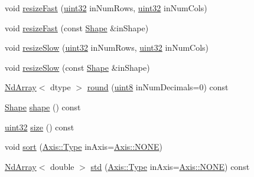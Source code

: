 \begin{DoxyCompactItemize}
\item 
void \mbox{\hyperlink{class_num_c_1_1_nd_array_a6a46a3ea9c292d315d6dc2e6381d2e0f}{resize\+Fast}} (\mbox{\hyperlink{namespace_num_c_ae685802ca6d3035f2b400b081e3953fa}{uint32}} in\+Num\+Rows, \mbox{\hyperlink{namespace_num_c_ae685802ca6d3035f2b400b081e3953fa}{uint32}} in\+Num\+Cols)
\item 
void \mbox{\hyperlink{class_num_c_1_1_nd_array_a2426f7ae3429f859e12e61f64965c81c}{resize\+Fast}} (const \mbox{\hyperlink{class_num_c_1_1_shape}{Shape}} \&in\+Shape)
\item 
void \mbox{\hyperlink{class_num_c_1_1_nd_array_abe49f888c39334d1a743f39fe45dc5ea}{resize\+Slow}} (\mbox{\hyperlink{namespace_num_c_ae685802ca6d3035f2b400b081e3953fa}{uint32}} in\+Num\+Rows, \mbox{\hyperlink{namespace_num_c_ae685802ca6d3035f2b400b081e3953fa}{uint32}} in\+Num\+Cols)
\item 
void \mbox{\hyperlink{class_num_c_1_1_nd_array_a5a73a3515f3be49f89af26ae3103c2a8}{resize\+Slow}} (const \mbox{\hyperlink{class_num_c_1_1_shape}{Shape}} \&in\+Shape)
\item 
\mbox{\hyperlink{class_num_c_1_1_nd_array}{Nd\+Array}}$<$ dtype $>$ \mbox{\hyperlink{class_num_c_1_1_nd_array_ac083fe73fd750871618990f44b3a854d}{round}} (\mbox{\hyperlink{namespace_num_c_a60b2e2f49e1ff61059731c154e560869}{uint8}} in\+Num\+Decimals=0) const
\item 
\mbox{\hyperlink{class_num_c_1_1_shape}{Shape}} \mbox{\hyperlink{class_num_c_1_1_nd_array_aa73e539af091f6a8f4830300101cd50b}{shape}} () const
\item 
\mbox{\hyperlink{namespace_num_c_ae685802ca6d3035f2b400b081e3953fa}{uint32}} \mbox{\hyperlink{class_num_c_1_1_nd_array_aedee1cbe27b3a3ff31b06d0003d69632}{size}} () const
\item 
void \mbox{\hyperlink{class_num_c_1_1_nd_array_aae7e14bb192456a85f253bc359625042}{sort}} (\mbox{\hyperlink{struct_num_c_1_1_axis_a8e689044ef1941a03482e730c5e7ebb3}{Axis\+::\+Type}} in\+Axis=\mbox{\hyperlink{struct_num_c_1_1_axis_a8e689044ef1941a03482e730c5e7ebb3a0ae033c4226f7184bf0050b101e7ed94}{Axis\+::\+N\+O\+NE}})
\item 
\mbox{\hyperlink{class_num_c_1_1_nd_array}{Nd\+Array}}$<$ double $>$ \mbox{\hyperlink{class_num_c_1_1_nd_array_a2f7450b2a02a7399a9fa69cbd5fa8005}{std}} (\mbox{\hyperlink{struct_num_c_1_1_axis_a8e689044ef1941a03482e730c5e7ebb3}{Axis\+::\+Type}} in\+Axis=\mbox{\hyperlink{struct_num_c_1_1_axis_a8e689044ef1941a03482e730c5e7ebb3a0ae033c4226f7184bf0050b101e7ed94}{Axis\+::\+N\+O\+NE}}) const
\item 

\end{DoxyCompactItemize}
